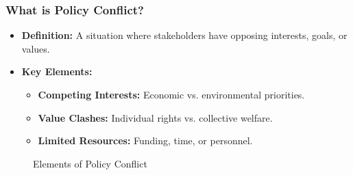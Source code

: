 \documentclass[10pt]{beamer}
\begin{document}
\begin{frame}
\frametitle{What is Policy Conflict?}
\begin{itemize}
   \item \textbf{Definition:} A situation where stakeholders have \alert{opposing interests, goals, or values}.
   \item \textbf{Key Elements:}
       \begin{itemize}
           \item \textbf{Competing Interests:} Economic vs. environmental priorities.
           \item \textbf{Value Clashes:} Individual rights vs. collective welfare.
           \item \textbf{Limited Resources:} Funding, time, or personnel.
       \end{itemize}
\end{itemize}

\begin{figure}
   \centering
   \caption{Elements of Policy Conflict}
\end{figure}
\end{frame}
\end{document}
